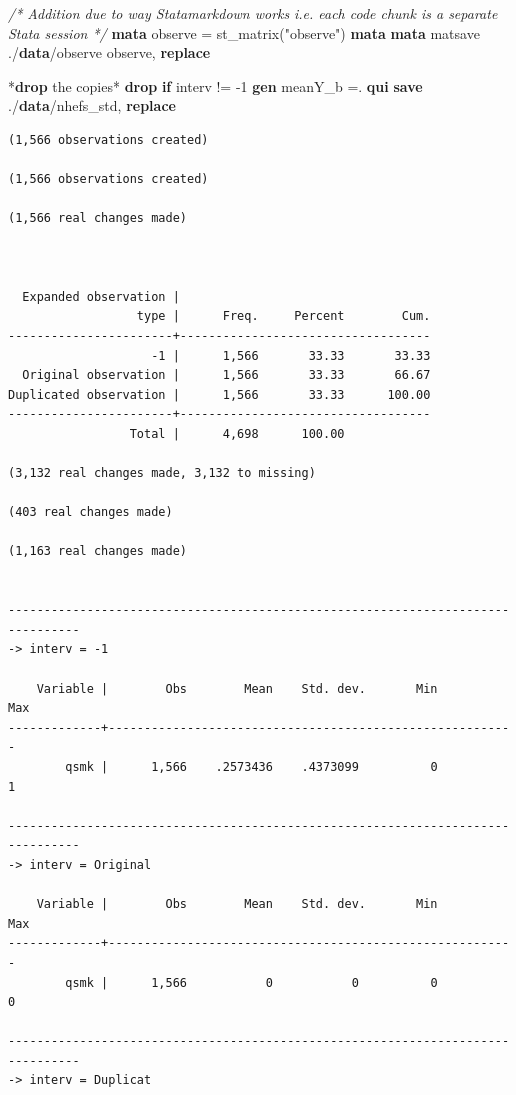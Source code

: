 \documentclass[
  10pt,
]{book}
\newenvironment{Shaded}{\begin{snugshade}}{\end{snugshade}}
\newcommand{\CommentTok}[1]{\textcolor[rgb]{0.56,0.35,0.01}{\textit{#1}}}
\newcommand{\KeywordTok}[1]{\textcolor[rgb]{0.13,0.29,0.53}{\textbf{#1}}}
\newcommand{\NormalTok}[1]{#1}
\newcommand{\StringTok}[1]{\textcolor[rgb]{0.31,0.60,0.02}{#1}}
\begin{document}
\begin{Shaded}
\begin{Highlighting}[]
\CommentTok{/* Addition due to way Statamarkdown works }
\CommentTok{i.e. each code chunk is a separate Stata session */}
\KeywordTok{mata}\NormalTok{ observe = st\_matrix(}\StringTok{"observe"}\NormalTok{)}
\KeywordTok{mata} \KeywordTok{mata}\NormalTok{ matsave ./}\KeywordTok{data}\NormalTok{/observe observe, }\KeywordTok{replace}

\NormalTok{*}\KeywordTok{drop}\NormalTok{ the copies*}
\KeywordTok{drop} \KeywordTok{if}\NormalTok{ interv != {-}1}
\KeywordTok{gen}\NormalTok{ meanY\_b =.}
\KeywordTok{qui} \KeywordTok{save}\NormalTok{ ./}\KeywordTok{data}\NormalTok{/nhefs\_std, }\KeywordTok{replace}
\end{Highlighting}
\end{Shaded}

\begin{verbatim}
(1,566 observations created)

(1,566 observations created)

(1,566 real changes made)



  Expanded observation |
                  type |      Freq.     Percent        Cum.
-----------------------+-----------------------------------
                    -1 |      1,566       33.33       33.33
  Original observation |      1,566       33.33       66.67
Duplicated observation |      1,566       33.33      100.00
-----------------------+-----------------------------------
                 Total |      4,698      100.00

(3,132 real changes made, 3,132 to missing)

(403 real changes made)

(1,163 real changes made)


--------------------------------------------------------------------------------
-> interv = -1

    Variable |        Obs        Mean    Std. dev.       Min        Max
-------------+---------------------------------------------------------
        qsmk |      1,566    .2573436    .4373099          0          1

--------------------------------------------------------------------------------
-> interv = Original

    Variable |        Obs        Mean    Std. dev.       Min        Max
-------------+---------------------------------------------------------
        qsmk |      1,566           0           0          0          0

--------------------------------------------------------------------------------
-> interv = Duplicat


\end{verbatim}
\end{document}
